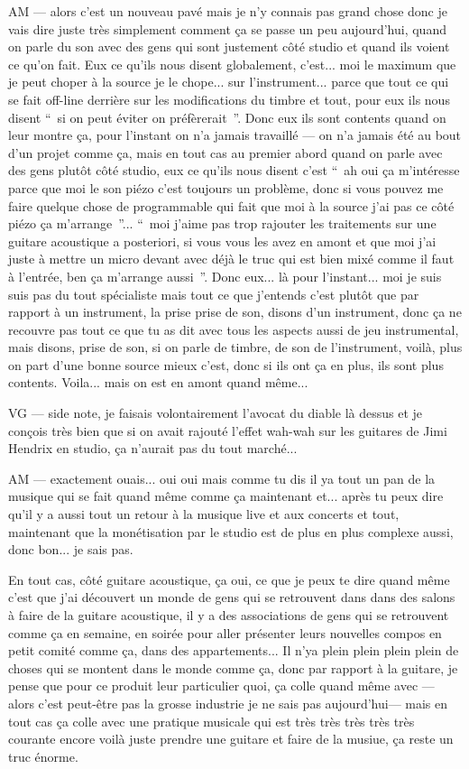 AM — alors c'est un nouveau pavé mais je n'y connais pas grand chose donc je vais dire juste très simplement comment ça se passe un peu aujourd'hui, quand on parle du son avec des gens qui sont justement côté studio et quand ils voient ce qu'on fait. Eux ce qu'ils nous disent globalement, c'est... moi le maximum que je peut choper à la source je le chope... sur l'instrument... parce que tout ce qui se fait off-line derrière sur les modifications du timbre et tout, pour eux ils nous disent “ si on peut éviter on préfèrerait ”. Donc eux ils sont contents quand on leur montre ça, pour l'instant on n'a jamais travaillé — on n'a jamais été au bout d'un projet comme ça, mais en tout cas au premier abord quand on parle avec des gens plutôt côté studio, eux ce qu'ils nous disent c'est “ ah oui ça m'intéresse parce que moi le son piézo c'est toujours un problème, donc si vous pouvez me faire quelque chose de programmable qui fait que moi à la source j'ai pas ce côté piézo ça m'arrange ”... “ moi j'aime pas trop rajouter les traitements sur une guitare acoustique a posteriori, si vous vous les avez en amont et que moi j'ai juste à mettre un micro devant avec déjà le truc qui est bien mixé comme il faut à l'entrée, ben ça m'arrange aussi ”. Donc eux... là pour l'instant... moi je suis suis pas du tout spécialiste mais tout ce que j'entends c'est plutôt que par rapport à un instrument, la prise prise de son, disons d'un instrument, donc ça ne recouvre pas tout ce que tu as dit avec tous les aspects aussi de jeu instrumental, mais disons, prise de son, si on parle de timbre, de son de l'instrument, voilà, plus on part d'une bonne source mieux c'est, donc si ils ont ça en plus, ils sont plus contents. Voila... mais on est en amont quand même... 

VG —  side note, je faisais volontairement l'avocat du diable là dessus et je conçois très bien que si on avait rajouté l'effet wah-wah sur les guitares de Jimi Hendrix en studio, ça n'aurait pas du tout marché... 

AM — exactement ouais... oui oui mais comme tu dis il ya tout un pan de la musique qui se fait quand même comme ça maintenant et... après tu peux dire qu'il y a aussi tout un retour à la musique live et aux concerts et tout, maintenant que la monétisation par le studio est de plus en plus complexe aussi, donc bon... je sais pas. 

En tout cas, côté guitare acoustique, ça oui, ce que je peux te dire quand même c'est que j'ai découvert un monde de gens qui se retrouvent dans dans des salons à faire de la guitare acoustique, il y a des associations de gens qui se retrouvent comme ça en semaine, en soirée pour aller présenter leurs nouvelles compos en petit comité comme ça, dans des appartements... Il n'ya plein plein plein plein de choses qui se montent dans le monde comme ça, donc par rapport à la guitare, je pense que pour ce produit leur particulier quoi, ça colle quand même avec — alors c'est peut-être pas la grosse industrie je ne sais pas aujourd'hui— mais en tout cas ça colle avec une pratique musicale qui est très très très très très courante encore voilà juste prendre une guitare et faire de la musiue, ça reste un truc énorme.

